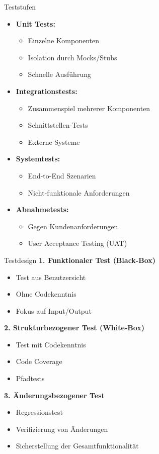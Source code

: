 \begin{concept}{Teststufen}
\begin{itemize}
\item \textbf{Unit Tests:} 
\begin{itemize}
    \item Einzelne Komponenten
    \item Isolation durch Mocks/Stubs
    \item Schnelle Ausführung
\end{itemize}

\item \textbf{Integrationstests:} 
\begin{itemize} 
    \item Zusammenspiel mehrerer Komponenten
    \item Schnittstellen-Tests
    \item Externe Systeme
\end{itemize}

\item \textbf{Systemtests:} 
\begin{itemize}
    \item End-to-End Szenarien
    \item Nicht-funktionale Anforderungen
\end{itemize}

\item \textbf{Abnahmetests:} 
\begin{itemize}
    \item Gegen Kundenanforderungen
    \item User Acceptance Testing (UAT)
\end{itemize}
\end{itemize}
\end{concept}

\begin{KR}{Testdesign}
\textbf{1. Funktionaler Test (Black-Box)}
\begin{itemize}
    \item Test aus Benutzersicht
    \item Ohne Codekenntnis
    \item Fokus auf Input/Output
\end{itemize}

\textbf{2. Strukturbezogener Test (White-Box)}
\begin{itemize}
    \item Test mit Codekenntnis
    \item Code Coverage
    \item Pfadtests
\end{itemize}

\textbf{3. Änderungsbezogener Test}
\begin{itemize}
    \item Regressionstest
    \item Verifizierung von Änderungen
    \item Sicherstellung der Gesamtfunktionalität
\end{itemize}
\end{KR}

